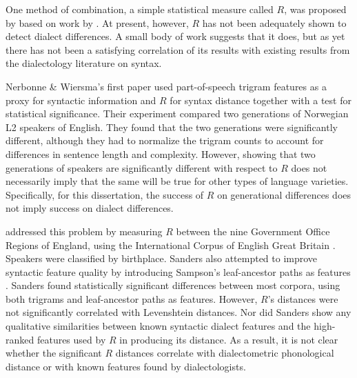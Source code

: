 One method of combination, a simple statistical measure called $R$,
was proposed by  based on work by
. At present, however, $R$ has not been adequately
shown to detect dialect differences. A small body of work suggests
that it does, but as yet there has not been a satisfying correlation
of its results with existing results from the dialectology literature
on syntax.

Nerbonne \& Wiersma's first paper used part-of-speech trigram features
as a proxy for syntactic information and $R$ for syntax distance
together with a test for statistical significance\cite{nerbonne06}.
Their experiment compared two generations of Norwegian L2 speakers of
English.  They found that the two generations were significantly
different, although they had to normalize the trigram counts to
account for differences in sentence length and complexity. However,
showing that two generations of speakers are significantly different
with respect to $R$ does not necessarily imply that the same will be
true for other types of language varieties. Specifically, for this
dissertation, the success of $R$ on generational differences does not
imply success on dialect differences.

 addressed this problem by measuring $R$ between
the nine Government Office Regions of England, using the International
Corpus of English Great Britain \cite{nelson02}. Speakers were classified by
birthplace. Sanders also attempted to improve syntactic feature
quality by introducing Sampson's leaf-ancestor paths as
features \cite{sampson00}. Sanders found statistically
significant differences between most corpora, using both trigrams and
leaf-ancestor paths as features. However, $R$'s distances were not
significantly correlated with Levenshtein distances. Nor did Sanders
show any qualitative similarities between known syntactic dialect
features and the high-ranked features used by $R$ in producing its
distance. As a result, it is not clear whether the significant $R$ distances
correlate with dialectometric phonological distance or with known
features found by dialectologists.


